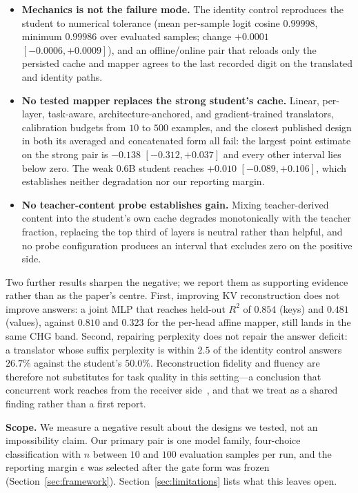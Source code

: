 \documentclass{article} %
\newcommand{\kv}{\ensuremath{\mathrm{KV}}}
\begin{document}
\begin{itemize}
\item \textbf{Mechanics is not the failure mode.} The identity control
reproduces the student to numerical tolerance (mean per-sample logit cosine
$0.99998$, minimum $0.99986$ over evaluated samples; change $+0.0001$
$[-0.0006,+0.0009]$), and an offline/online pair that reloads only the persisted
cache and mapper agrees to the last recorded digit on the translated and
identity paths.
\item \textbf{No tested mapper replaces the strong student's cache.} Linear,
per-layer, task-aware, architecture-anchored, and gradient-trained
translators, calibration budgets from $10$ to $500$ examples, and the closest
published design in both its averaged and concatenated form all fail: the
largest point estimate on the strong pair is $-0.138$ $[-0.312,+0.037]$ and
every other interval lies below zero. The weak $0.6$B student reaches $+0.010$
$[-0.089,+0.106]$, which establishes neither degradation nor our reporting
margin.
\item \textbf{No teacher-content probe establishes gain.} Mixing teacher-derived
content into the student's own cache degrades monotonically with the teacher
fraction, replacing the top third of layers is neutral rather than helpful, and
no probe configuration produces an interval that excludes zero on the positive
side.
\end{itemize}

Two further results sharpen the negative; we report them as supporting evidence
rather than as the paper's centre. First, improving \kv{}
reconstruction does not improve answers: a joint MLP that reaches held-out
$R^2$ of $0.854$ (keys) and $0.481$ (values), against $0.810$ and $0.323$ for
the per-head affine mapper, still lands in the same CHG band. Second, repairing
perplexity does not repair the answer deficit: a translator whose suffix
perplexity is within $2.5$ of the identity control answers $26.7\%$ against the
student's $50.0\%$. Reconstruction fidelity and fluency are therefore not
substitutes for task quality in this setting---a conclusion that concurrent
work reaches from the receiver side~\citep{cachelink2026}, and that we treat as
a shared finding rather than a first report.

\textbf{Scope.} We measure a negative result about the designs we tested, not
an impossibility claim. Our primary pair is one model family, four-choice
classification with $n$ between $10$ and $100$ evaluation samples per run, and
the reporting margin $\epsilon$ was selected after the gate form was frozen
(Section~\ref{sec:framework}). Section~\ref{sec:limitations} lists what this
leaves open.
\end{document}

